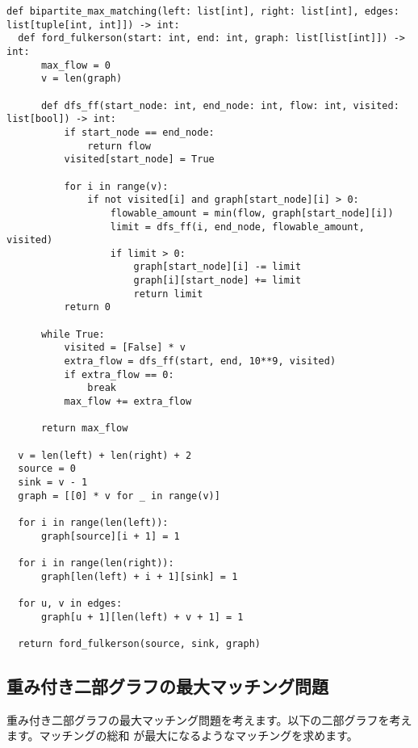 \begin{lstlisting}[caption=二部グラフの最大マッチング問題の実装, label=bipartite_matching, frame=TRBL, label={bipartite_matching}]
def bipartite_max_matching(left: list[int], right: list[int], edges: list[tuple[int, int]]) -> int:
  def ford_fulkerson(start: int, end: int, graph: list[list[int]]) -> int:
      max_flow = 0
      v = len(graph)

      def dfs_ff(start_node: int, end_node: int, flow: int, visited: list[bool]) -> int:
          if start_node == end_node:
              return flow
          visited[start_node] = True

          for i in range(v):
              if not visited[i] and graph[start_node][i] > 0:
                  flowable_amount = min(flow, graph[start_node][i])
                  limit = dfs_ff(i, end_node, flowable_amount, visited)
                  if limit > 0:
                      graph[start_node][i] -= limit
                      graph[i][start_node] += limit
                      return limit
          return 0

      while True:
          visited = [False] * v
          extra_flow = dfs_ff(start, end, 10**9, visited)
          if extra_flow == 0:
              break
          max_flow += extra_flow

      return max_flow

  v = len(left) + len(right) + 2  
  source = 0
  sink = v - 1
  graph = [[0] * v for _ in range(v)]

  for i in range(len(left)):
      graph[source][i + 1] = 1  

  for i in range(len(right)):
      graph[len(left) + i + 1][sink] = 1 

  for u, v in edges:
      graph[u + 1][len(left) + v + 1] = 1  

  return ford_fulkerson(source, sink, graph)
\end{lstlisting}

\subsection{重み付き二部グラフの最大マッチング問題}
重み付き二部グラフの最大マッチング問題を考えます。以下の二部グラフを考えます。マッチングの総和
が最大になるようなマッチングを求めます。

\vspace{0.5cm}

